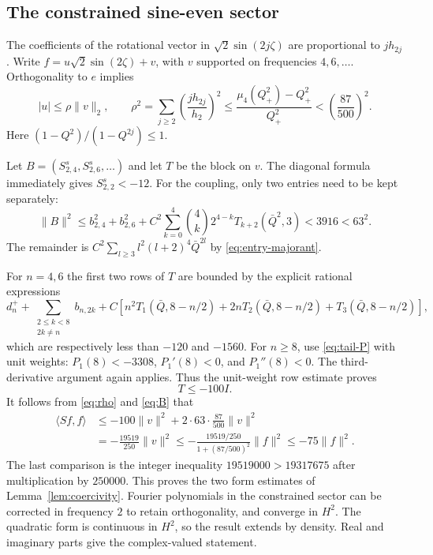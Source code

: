 \documentclass[a4paper,11pt]{article}
\numberwithin{equation}{section}
\theoremstyle{definition}
\theoremstyle{remark}
\newcommand{\norm}[1]{\lVert#1\rVert}
\newcommand{\ip}[2]{\langle#1,#2\rangle}
\begin{document}
\subsection{The constrained sine-even sector}
The coefficients of the rotational vector in $\sqrt2\sin(2j\zeta)$ are proportional to $j h_{2j}$. Write $f=u\sqrt2\sin(2\zeta)+v$, with $v$ supported on frequencies $4,6,\ldots$. Orthogonality to $e$ implies
\begin{equation}\label{eq:rho}
 |u|\le\rho\norm v_2,\qquad
 \rho^2=\sum_{j\ge2}\left(\frac{j h_{2j}}{h_2}\right)^2
 \le\frac{\mu_4(Q_+^2)-Q_+^2}{Q_+^2}<\left(\frac{87}{500}\right)^2.
\end{equation}
Here $(1-Q^2)/(1-Q^{2j})\le1$.

Let $B=(S^s_{2,4},S^s_{2,6},\ldots)$ and let $T$ be the block on $v$. The diagonal formula immediately gives $S^s_{2,2}<-12$. For the coupling, only two entries need to be kept separately:
\begin{equation}\label{eq:B}
 \norm B^2\le b_{2,4}^2+b_{2,6}^2+
 C^2\sum_{k=0}^4\binom4k 2^{4-k}T_{k+2}(\bar Q^2,3)
 <3916<63^2.
\end{equation}
The remainder is $C^2\sum_{l\ge3}l^2(l+2)^4\bar Q^{2l}$ by \eqref{eq:entry-majorant}.

For $n=4,6$ the first two rows of $T$ are bounded by the explicit rational expressions
\begin{equation}\label{eq:T-low}
 d_n^++\sum_{\substack{2\le k<8\\2k\ne n}}b_{n,2k}
 +C\left[n^2T_1(\bar Q,8-n/2)+2nT_2(\bar Q,8-n/2)
 +T_3(\bar Q,8-n/2)\right],
\end{equation}
which are respectively less than $-120$ and $-1560$. For $n\ge8$, use \eqref{eq:tail-P} with unit weights: $P_1(8)<-3308$, $P_1'(8)<0$, and $P_1''(8)<0$. The third-derivative argument again applies. Thus the unit-weight row estimate proves
\[
 T\le-100I.
\]
It follows from \eqref{eq:rho} and \eqref{eq:B} that
\begin{align*}
 \ip{Sf}f
 &\le-100\norm v^2+2\cdot63\cdot\frac{87}{500}\norm v^2\\
 &=-\frac{19519}{250}\norm v^2
 \le-\frac{19519/250}{1+(87/500)^2}\norm f^2
 \le-75\norm f^2.
\end{align*}
The last comparison is the integer inequality $19519000>19317675$ after multiplication by $250000$. This proves the two form estimates of Lemma~\ref{lem:coercivity}. Fourier polynomials in the constrained sector can be corrected in frequency $2$ to retain orthogonality, and converge in $H^2$. The quadratic form is continuous in $H^2$, so the result extends by density. Real and imaginary parts give the complex-valued statement.
\end{document}
